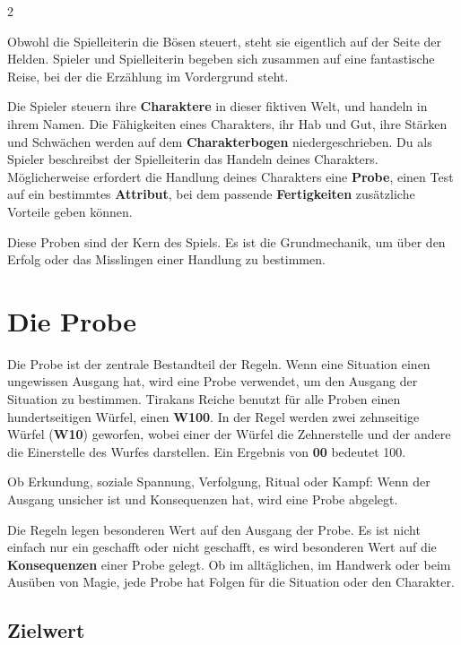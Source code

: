 \label{ch:game-rules}

\begin{multicols*}{2}

Obwohl die Spielleiterin die Bösen steuert, steht sie eigentlich auf der Seite der Helden.
Spieler und Spielleiterin begeben sich zusammen auf eine fantastische Reise, bei der die Erzählung im Vordergrund steht.

Die Spieler steuern ihre \textbf{Charaktere} in dieser fiktiven Welt, und handeln in ihrem Namen.
Die Fähigkeiten eines Charakters, ihr Hab und Gut, ihre Stärken und Schwächen werden auf dem \textbf{Charakterbogen} niedergeschrieben.
Du als Spieler beschreibst der Spielleiterin das Handeln deines Charakters.
Möglicherweise erfordert die Handlung deines Charakters eine \textbf{Probe}, einen Test auf ein bestimmtes \textbf{Attribut}, bei dem passende \textbf{Fertigkeiten} zusätzliche Vorteile geben können.

Diese Proben sind der Kern des Spiels.
Es ist die Grundmechanik, um über den Erfolg oder das Misslingen einer Handlung zu bestimmen.

\section{Die Probe}\label{sec:die-probe}

Die Probe ist der zentrale Bestandteil der Regeln.
Wenn eine Situation einen ungewissen Ausgang hat, wird eine Probe verwendet, um den Ausgang der Situation zu bestimmen.
Tirakans Reiche benutzt für alle Proben einen hundertseitigen Würfel, einen \textbf{W100}.
In der Regel werden zwei zehnseitige Würfel (\textbf{W10}) geworfen, wobei einer der Würfel die Zehnerstelle und der andere die Einerstelle des Wurfes darstellen.
Ein Ergebnis von \textbf{00} bedeutet 100.

Ob Erkundung, soziale Spannung, Verfolgung, Ritual oder Kampf: Wenn der Ausgang unsicher ist und Konsequenzen hat, wird eine Probe abgelegt.

Die Regeln legen besonderen Wert auf den Ausgang der Probe. Es ist nicht einfach nur ein geschafft oder nicht geschafft, es wird besonderen Wert auf die \textbf{Konsequenzen} einer Probe gelegt. Ob im alltäglichen, im Handwerk oder beim Ausüben von Magie, jede Probe hat Folgen für die Situation oder den Charakter.

\subsection{Zielwert}\label{subsec:zielwert}


\end{multicols*}
